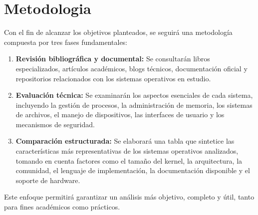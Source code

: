 \section*{Metodologia}

Con el fin de alcanzar los objetivos planteados, se seguirá una metodología compuesta por tres fases fundamentales:

\begin{enumerate}
\item \textbf{Revisión bibliográfica y documental:} Se consultarán libros especializados, artículos académicos, blogs técnicos, documentación oficial y repositorios relacionados con los sistemas operativos en estudio.

\item \textbf{Evaluación técnica:} Se examinarán los aspectos esenciales de cada sistema, incluyendo la gestión de procesos, la administración de memoria, los sistemas de archivos, el manejo de dispositivos, las interfaces de usuario y los mecanismos de seguridad.  

\item \textbf{Comparación estructurada:} Se elaborará una tabla que sintetice las características más representativas de los sistemas operativos analizados, tomando en cuenta factores como el tamaño del kernel, la arquitectura, la comunidad, el lenguaje de implementación, la documentación disponible y el soporte de hardware.  


\end{enumerate}

Este enfoque permitirá garantizar un análisis más objetivo, completo y útil, tanto para fines académicos como prácticos.

